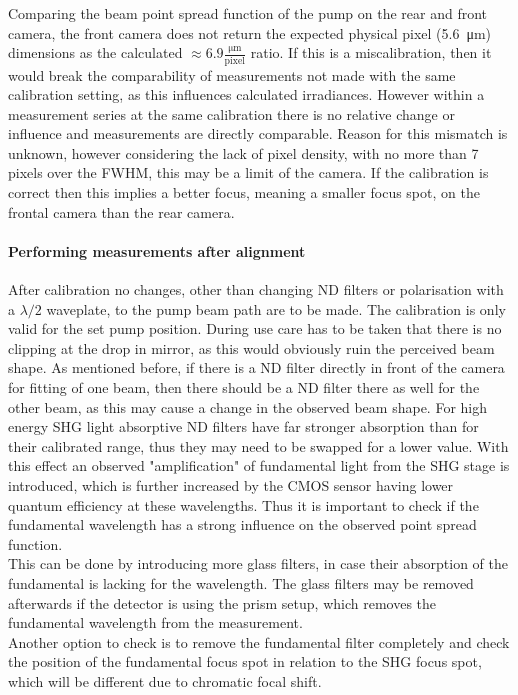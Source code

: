 \documentclass[twoside,openright,listof=numbered]{scrreprt}
\begin{document}
Comparing the beam point spread function of the pump on the rear and front camera, the front camera does not return the expected physical pixel (\qty{5.6}{\micro\meter}) dimensions as the calculated $\approx\mathrm{6.9\frac{\mu m}{pixel}}$ ratio. If this is a miscalibration, then it would break the comparability of measurements not made with the same calibration setting, as this influences calculated irradiances. However within a measurement series at the same calibration there is no relative change or influence and measurements are directly comparable. Reason for this mismatch is unknown, however considering the lack of pixel density, with no more than 7 pixels over the FWHM, this may be a limit of the camera. If the calibration is correct then this implies a better focus, meaning a smaller focus spot, on the frontal camera than the rear camera.

\paragraph{Performing measurements after alignment}
After calibration no changes, other than changing ND filters or polarisation with a $\lambda/2$ waveplate, to the pump beam path are to be made. The calibration is only valid for the set pump position. During use care has to be taken that there is no clipping at the drop in mirror, as this would obviously ruin the perceived beam shape. As mentioned before, if there is a ND filter directly in front of the camera for fitting of one beam, then there should be a ND filter there as well for the other beam, as this may cause a change in the observed beam shape. For high energy SHG light absorptive ND filters have far stronger absorption than for their calibrated range, thus they may need to be swapped for a lower value. With this effect an observed "amplification" of fundamental light from the SHG stage is introduced, which is further increased by the CMOS sensor having lower quantum efficiency at these wavelengths. Thus it is important to check if the fundamental wavelength has a strong influence on the observed point spread function.\\
This can be done by introducing more glass filters, in case their absorption of the fundamental is lacking for the wavelength. The glass filters may be removed afterwards if the detector is using the prism setup, which removes the fundamental wavelength from the measurement.\\
Another option to check is to remove the fundamental filter completely and check the position of the fundamental focus spot in relation to the SHG focus spot, which will be different due to chromatic focal shift.
\end{document}
